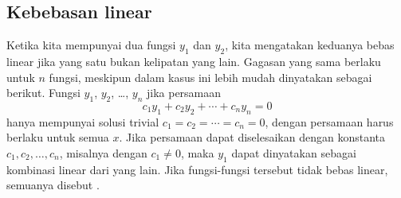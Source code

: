 \subsection{Kebebasan linear}

Ketika kita mempunyai dua fungsi $y_1$ dan $y_2$, kita mengatakan keduanya bebas linear jika yang satu bukan kelipatan yang lain. Gagasan yang sama berlaku untuk $n$ fungsi, meskipun dalam kasus ini lebih mudah dinyatakan sebagai berikut. Fungsi $y_1$, $y_2$, \ldots, $y_n$ \emph{} jika persamaan
\begin{equation*}
c_1 y_1 + c_2 y_2 + \cdots + c_n y_n = 0
\end{equation*}
hanya mempunyai solusi trivial $c_1 = c_2 = \cdots = c_n = 0$, dengan persamaan harus berlaku untuk semua $x$. Jika persamaan dapat diselesaikan dengan konstanta $c_1,c_2,\ldots,c_n$, misalnya dengan $c_1 \neq 0$, maka $y_1$ dapat dinyatakan sebagai kombinasi linear dari yang lain. Jika fungsi-fungsi tersebut tidak bebas linear, semuanya disebut \emph{}.

